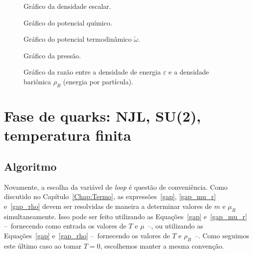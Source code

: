\begin{figure}
	
	\caption{Gráfico da densidade escalar. \protect}
	\label{Fig:scalar_density_NJL-D_1}
\end{figure}

\begin{figure}
	
	\caption{Gráfico do potencial químico. \protect}
	\label{Fig:chemical_potential_NJL-D_1}
\end{figure}

\begin{figure}
	
	\caption{Gráfico do potencial termodinâmico $\tilde{\omega}$. \protect}
	\label{Fig:thermodynamic_potential_NJL-D_1}
\end{figure}

\begin{figure}
	
	\caption{Gráfico da pressão. \protect}
	\label{Fig:pressure_NJL-D_1}
\end{figure}

\begin{figure}
	
	\caption{Gráfico da razão entre a densidade de energia $\varepsilon$ e a densidade bariônica $\rho_B$ (energia por partícula). \protect}
	\label{Fig:energy_density_per_particle_NJL-D_1}
\end{figure}

\FloatBarrier

\section{Fase de quarks: NJL, SU(2), temperatura finita}

\subsection{Algoritmo}

Novamente, a escolha da variável de \emph{loop} é questão de conveniência. Como discutido no Capítulo~\ref{Chap:Termo}, as expressões~\eqref{gap}, \eqref{gap_mu_r} e~\eqref{gap_rho} devem ser resolvidas de maneira a determinar valores de $m$ e $\mu_R$ simultaneamente. Isso pode ser feito utilizando as Equações~\eqref{gap} e~\eqref{gap_mu_r} --~fornecendo como entrada os valores de $T$ e $\mu$~--, ou utilizando as Equações~\eqref{gap} e~\eqref{gap_rho} --~fornecendo os valores de $T$ e $\rho_B$~--. Como seguimos este último caso ao tomar $T = 0$, escolhemos manter a mesma convenção.

